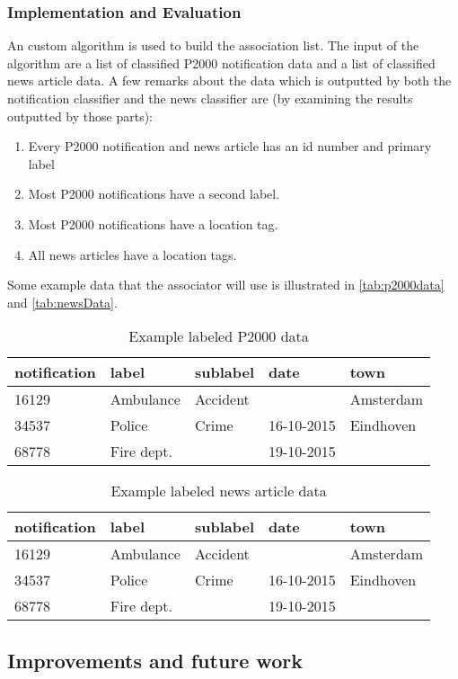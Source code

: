 \subsubsection*{Implementation and Evaluation }
An custom algorithm is used to build the association list. The input of the algorithm are a list of classified P2000 notification data and a list of classified news article data. A few remarks about the data which is outputted by both the notification classifier and the news classifier are (by examining the results outputted by those parts):
\begin{enumerate}
\item Every P2000 notification and news article has an id number and primary label
\item Most P2000 notifications have a second label. 
\item Most P2000 notifications have a location tag.
\item All news articles have a location tags.
\end{enumerate}

Some example data that the associator will use is illustrated in \autoref{tab:p2000data} and \autoref{tab:newsData}. 
\begin{table}[]
\centering
\begin{tabular}{|l|l|l|l|l|}
\hline
\textbf{notification} & \textbf{label} & \textbf{sublabel} & \textbf{date} & \textbf{town} \\ \hline
16129                 & Ambulance      & Accident          &               & Amsterdam     \\ \hline
34537                 & Police         & Crime             & 16-10-2015    & Eindhoven     \\ \hline
68778                 & Fire dept.     &                   & 19-10-2015    &               \\ \hline
\end{tabular}
\caption{Example labeled P2000 data}
\label{tab:p2000data}
\end{table}

\begin{table}[]
\centering
\begin{tabular}{|l|l|l|l|l|}
\hline
\textbf{notification} & \textbf{label} & \textbf{sublabel} & \textbf{date} & \textbf{town} \\ \hline
16129                 & Ambulance      & Accident          &               & Amsterdam     \\ \hline
34537                 & Police         & Crime             & 16-10-2015    & Eindhoven     \\ \hline
68778                 & Fire dept.     &                   & 19-10-2015    &               \\ \hline
\end{tabular}
\caption{Example labeled news article data}
\label{tab:newsData}
\end{table}


\subsection{Improvements and future work}